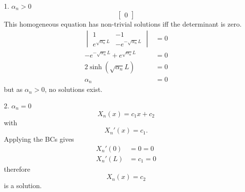 \documentclass{article}
\begin{document}
\begin{proofcase}{1. \(\alpha_n > 0\)}
\begin{equation*}
\begin{bmatrix*}
            0
        \end{bmatrix*}
    \end{equation*}
    This homogeneous equation has non-trivial solutions iff the determinant is zero.
    \begin{align*}
        \begin{vmatrix*}
            1 & -1 \\
            e^{\sqrt{\alpha_n} L} & -e^{-\sqrt{\alpha_n} L}
        \end{vmatrix*}
                                                        & = 0 \\
        -e^{-\sqrt{\alpha_n} L} + e^{\sqrt{\alpha_n} L} & = 0 \\
        2\sinh{\left( \sqrt{\alpha_n} L \right)}        & = 0 \\
        \alpha_n                                        & = 0
    \end{align*}
    but as \(\alpha_n > 0\), no solutions exist.
\end{proofcase}
\begin{proofcase}{2. \(\alpha_n = 0\)}\let\qed\relax
    \begin{equation*}
        X_n\left( x \right) = c_1 x + c_2
    \end{equation*}
    with
    \begin{equation*}
        X_n'\left( x \right) = c_1.
    \end{equation*}
    Applying the BCs gives
    \begin{align*}
        X_n'\left( 0 \right) & = 0 = 0   \\
        X_n'\left( L \right) & = c_1 = 0
    \end{align*}
    therefore
    \begin{equation*}
        X_n\left( x \right) = c_2
    \end{equation*}
    is a solution.
\end{proofcase}
\end{document}

